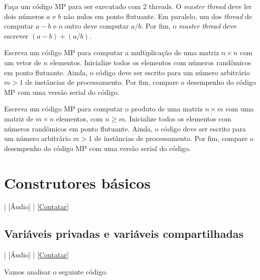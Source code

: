 \begin{exer}
  Faça um código MP para ser executado com 2 threads. O {\it master thread} deve ler dois números $a$ e $b$ não nulos em ponto flutuante. Em paralelo, um dos {\it thread} de computar $a-b$ e o outro deve computar $a/b$. Por fim, o {\it master thread} deve escrever $(a-b) + (a/b)$.
\end{exer}

\begin{exer}\label{exer:cc_exer_Ax}
  Escreva um código MP para computar a multiplicação de uma matriz $n\times n$ com um vetor de $n$ elementos. Inicialize todos os elementos com números randômicos em ponto flutuante. Ainda, o código deve ser escrito para um número arbitrário $m>1$ de instâncias de processamento. Por fim, compare o desempenho do código MP com uma versão serial do código.
\end{exer}

\begin{exer}\label{exer:cc_exer_AB}
  Escreva um código MP para computar o produto de uma matriz $n\times m$ com uma matriz de $m\times n$ elementos, com $n \geq m$. Inicialize todos os elementos com números randômicos em ponto flutuante. Ainda, o código deve ser escrito para um número arbitrário $m>1$ de instâncias de processamento. Por fim, compare o desempenho do código MP com uma versão serial do código.
\end{exer}

\section{Construtores básicos}\label{cap_mp_sec_cb}

\begin{flushright}
  [Vídeo] | [Áudio] | \href{https://phkonzen.github.io/notas/contato.html}{[Contatar]}
\end{flushright}

\subsection{Variáveis privadas e variáveis compartilhadas}

\begin{flushright}
  [Vídeo] | [Áudio] | \href{https://phkonzen.github.io/notas/contato.html}{[Contatar]}
\end{flushright}

Vamos analisar o seguinte código.



